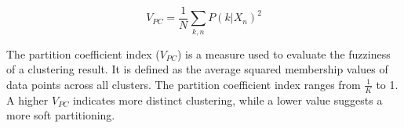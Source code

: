 \documentclass[12pt,letterpaper]{article}
\begin{document}
\begin{itemize}
    \[
    V_{PC} = \frac{1}{N} \sum_{k,n} P(k|X_n)^2
    \]

    \noindent The partition coefficient index (\(V_{PC}\)) is a measure used to evaluate the fuzziness of a clustering result. It is defined as the average squared membership values of data points across all clusters. 
    \noindent The partition coefficient index ranges from \( \frac{1}{K} \) to 1. A higher \(V_{PC}\) indicates more distinct clustering, while a lower value suggests a more soft partitioning.

    \end{itemize}
\end{document}
